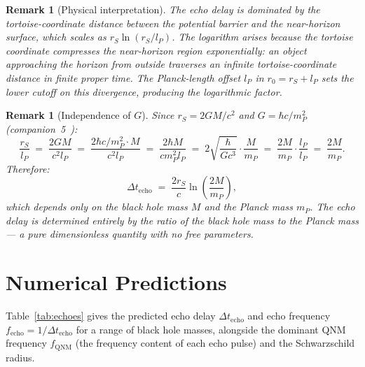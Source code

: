 \documentclass[12pt]{article}
\newtheorem{remark}[theorem]{Remark}
\newcommand{\lP}{l_P}
\newcommand{\mP}{m_P}
\newcommand{\rS}{r_S}
\newcommand{\Dt}{\Delta t_{\mathrm{echo}}}
\begin{document}
\begin{remark}[Physical interpretation]
The echo delay is dominated by the tortoise-coordinate distance between
the potential barrier and the near-horizon surface, which scales as
$\rS\ln(\rS/\lP)$.  The logarithm arises because the tortoise coordinate
compresses the near-horizon region exponentially: an object approaching
the horizon from outside traverses an infinite tortoise-coordinate distance
in finite proper time.  The Planck-length offset $\lP$ in $r_0 = \rS + \lP$
sets the lower cutoff on this divergence, producing the logarithmic factor.
\end{remark}

\begin{remark}[Independence of $G$]
Since $\rS = 2GM/c^2$ and $G = \hbar c/\mP^2$ (companion~5~\cite{c5}):
\begin{equation}
  \frac{\rS}{\lP} \;=\; \frac{2GM}{c^2\lP}
  \;=\; \frac{2\hbar c/\mP^2 \cdot M}{c^2\lP}
  \;=\; \frac{2\hbar M}{c\mP^2\lP}
  \;=\; 2\sqrt{\frac{\hbar}{Gc^3}}\cdot\frac{M}{\mP}
  \;=\; \frac{2M}{\mP}\cdot\frac{\lP}{\lP}
  \;=\; \frac{2M}{\mP}.
  \label{eq:rs_over_lp}
\end{equation}
Therefore:
\begin{equation}
  \Dt \;=\; \frac{2\rS}{c}\ln\!\left(\frac{2M}{\mP}\right),
  \label{eq:delay_planck}
\end{equation}
which depends only on the black hole mass $M$ and the Planck mass $\mP$.
The echo delay is determined entirely by the ratio of the black hole mass
to the Planck mass — a pure dimensionless quantity with no free parameters.
\end{remark}

\section{Numerical Predictions}
\label{sec:predictions}

Table~\ref{tab:echoes} gives the predicted echo delay $\Dt$ and echo
frequency $f_{\mathrm{echo}} = 1/\Dt$ for a range of black hole masses,
alongside the dominant QNM frequency $f_{\mathrm{QNM}}$ (the frequency
content of each echo pulse) and the Schwarzschild radius.
\end{document}
